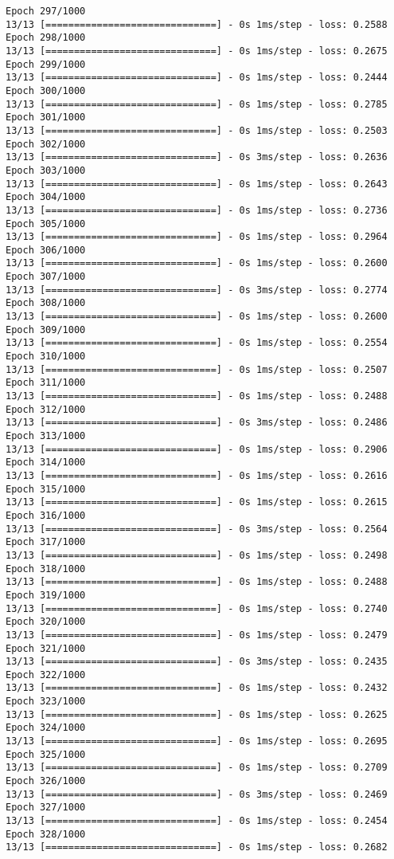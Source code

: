 \documentclass[11pt]{article}
\begin{document}
\begin{Verbatim}[commandchars=\\\{\}]
Epoch 297/1000
13/13 [==============================] - 0s 1ms/step - loss: 0.2588
Epoch 298/1000
13/13 [==============================] - 0s 1ms/step - loss: 0.2675
Epoch 299/1000
13/13 [==============================] - 0s 1ms/step - loss: 0.2444
Epoch 300/1000
13/13 [==============================] - 0s 1ms/step - loss: 0.2785
Epoch 301/1000
13/13 [==============================] - 0s 1ms/step - loss: 0.2503
Epoch 302/1000
13/13 [==============================] - 0s 3ms/step - loss: 0.2636
Epoch 303/1000
13/13 [==============================] - 0s 1ms/step - loss: 0.2643
Epoch 304/1000
13/13 [==============================] - 0s 1ms/step - loss: 0.2736
Epoch 305/1000
13/13 [==============================] - 0s 1ms/step - loss: 0.2964
Epoch 306/1000
13/13 [==============================] - 0s 1ms/step - loss: 0.2600
Epoch 307/1000
13/13 [==============================] - 0s 3ms/step - loss: 0.2774
Epoch 308/1000
13/13 [==============================] - 0s 1ms/step - loss: 0.2600
Epoch 309/1000
13/13 [==============================] - 0s 1ms/step - loss: 0.2554
Epoch 310/1000
13/13 [==============================] - 0s 1ms/step - loss: 0.2507
Epoch 311/1000
13/13 [==============================] - 0s 1ms/step - loss: 0.2488
Epoch 312/1000
13/13 [==============================] - 0s 3ms/step - loss: 0.2486
Epoch 313/1000
13/13 [==============================] - 0s 1ms/step - loss: 0.2906
Epoch 314/1000
13/13 [==============================] - 0s 1ms/step - loss: 0.2616
Epoch 315/1000
13/13 [==============================] - 0s 1ms/step - loss: 0.2615
Epoch 316/1000
13/13 [==============================] - 0s 3ms/step - loss: 0.2564
Epoch 317/1000
13/13 [==============================] - 0s 1ms/step - loss: 0.2498
Epoch 318/1000
13/13 [==============================] - 0s 1ms/step - loss: 0.2488
Epoch 319/1000
13/13 [==============================] - 0s 1ms/step - loss: 0.2740
Epoch 320/1000
13/13 [==============================] - 0s 1ms/step - loss: 0.2479
Epoch 321/1000
13/13 [==============================] - 0s 3ms/step - loss: 0.2435
Epoch 322/1000
13/13 [==============================] - 0s 1ms/step - loss: 0.2432
Epoch 323/1000
13/13 [==============================] - 0s 1ms/step - loss: 0.2625
Epoch 324/1000
13/13 [==============================] - 0s 1ms/step - loss: 0.2695
Epoch 325/1000
13/13 [==============================] - 0s 1ms/step - loss: 0.2709
Epoch 326/1000
13/13 [==============================] - 0s 3ms/step - loss: 0.2469
Epoch 327/1000
13/13 [==============================] - 0s 1ms/step - loss: 0.2454
Epoch 328/1000
13/13 [==============================] - 0s 1ms/step - loss: 0.2682

\end{Verbatim}
\end{document}
